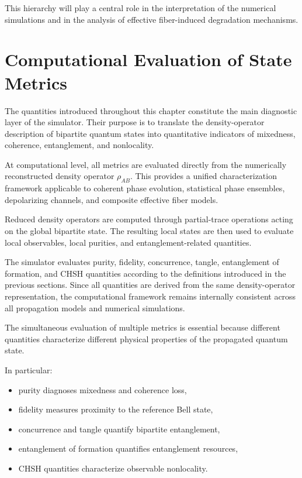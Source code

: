 This hierarchy will play a central role in the interpretation of the numerical simulations and in the analysis of effective fiber-induced degradation mechanisms.


\section{Computational Evaluation of State Metrics}

The quantities introduced throughout this chapter constitute the main diagnostic layer of the simulator. Their purpose is to translate the density-operator description of bipartite quantum states into quantitative indicators of mixedness, coherence, entanglement, and nonlocality.

\medskip

At computational level, all metrics are evaluated directly from the numerically reconstructed density operator \( \rho_{AB} \). This provides a unified characterization framework applicable to coherent phase evolution, statistical phase ensembles, depolarizing channels, and composite effective fiber models.

\medskip

Reduced density operators are computed through partial-trace operations acting on the global bipartite state. The resulting local states are then used to evaluate local observables, local purities, and entanglement-related quantities.

\medskip

The simulator evaluates purity, fidelity, concurrence, tangle, entanglement of formation, and CHSH quantities according to the definitions introduced in the previous sections. Since all quantities are derived from the same density-operator representation, the computational framework remains internally consistent across all propagation models and numerical simulations.

\medskip

The simultaneous evaluation of multiple metrics is essential because different quantities characterize different physical properties of the propagated quantum state.

In particular:

\begin{itemize}
    \item purity diagnoses mixedness and coherence loss,
    \item fidelity measures proximity to the reference Bell state,
    \item concurrence and tangle quantify bipartite entanglement,
    \item entanglement of formation quantifies entanglement resources,
    \item CHSH quantities characterize observable nonlocality.
\end{itemize}

